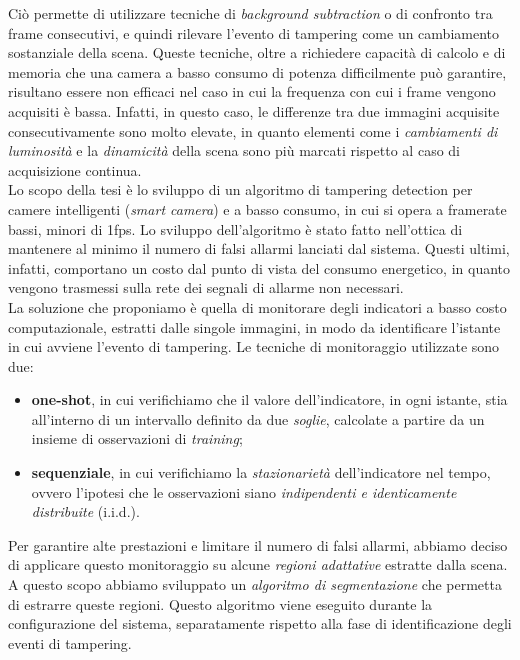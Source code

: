 Ci\`o permette di utilizzare tecniche di \textit{background subtraction} o di confronto tra frame consecutivi, e quindi rilevare l'evento di tampering come un cambiamento sostanziale della scena.
Queste tecniche, oltre a richiedere capacit\`a di calcolo e di memoria che una camera a basso consumo di potenza difficilmente pu\`o garantire, risultano essere non efficaci nel caso in cui la frequenza con cui i frame vengono acquisiti \`e bassa.
Infatti, in questo caso, le differenze tra due immagini acquisite consecutivamente sono molto elevate, in quanto elementi come i \textit{cambiamenti di luminosit\`a} e la \textit{dinamicit\`a} della scena sono pi\`u marcati rispetto al caso di acquisizione continua.\\
Lo scopo della tesi \`e lo sviluppo di un algoritmo di tampering detection per camere intelligenti (\textit{smart camera}) e a basso consumo, in cui si opera a framerate bassi, minori di 1fps.
Lo sviluppo dell'algoritmo \`e stato fatto nell'ottica di mantenere al minimo il numero di falsi allarmi lanciati dal sistema.
Questi ultimi, infatti, comportano un costo dal punto di vista del consumo energetico, in quanto vengono trasmessi sulla rete dei segnali di allarme non necessari.\\
La soluzione che proponiamo \`e quella di monitorare degli indicatori a basso costo computazionale, estratti dalle singole immagini, in modo da identificare l'istante in cui avviene l'evento di tampering.
Le tecniche di monitoraggio utilizzate sono due:
\begin{itemize}
	\item \textbf{one-shot}, in cui verifichiamo che il valore dell'indicatore, in ogni istante, stia all'interno di un intervallo definito da due \textit{soglie}, calcolate a partire da un insieme di osservazioni di \textit{training};
	\item \textbf{sequenziale}, in cui verifichiamo la \textit{stazionariet\`a} dell'indicatore nel tempo, ovvero l'ipotesi che le osservazioni siano \textit{indipendenti e identicamente distribuite} (i.i.d.).
\end{itemize}
Per garantire alte prestazioni e limitare il numero di falsi allarmi, abbiamo deciso di applicare questo monitoraggio su alcune \textit{regioni adattative} estratte dalla scena.
A questo scopo abbiamo sviluppato un \textit{algoritmo di segmentazione} che permetta di estrarre queste regioni.
Questo algoritmo viene eseguito durante la configurazione del sistema, separatamente rispetto alla fase di identificazione degli eventi di tampering.
